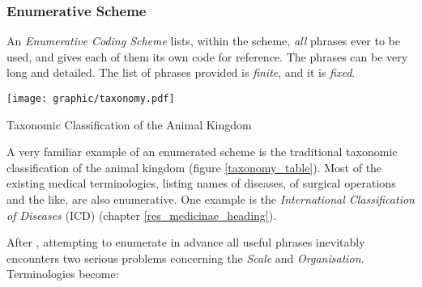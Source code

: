 %
%
%
%
%
%
%

\subsubsection{Enumerative Scheme}
\label{enumerative_scheme_heading}

An \emph{Enumerative Coding Scheme} lists, within the scheme, \emph{all} phrases
ever to be used, and gives each of them its own code for reference. The phrases
can be very long and detailed. The list of phrases provided is \emph{finite},
and it is \emph{fixed}.

\begin{table}[ht]
    \begin{center}
        \texttt{[image: graphic/taxonomy.pdf]}
        \caption{Taxonomic Classification of the Animal Kingdom}
        \label{taxonomy_table}
    \end{center}
\end{table}

A very familiar example of an enumerated scheme is the traditional taxonomic
classification of the animal kingdom (figure \ref{taxonomy_table}). Most of the
existing medical terminologies, listing names of diseases, of surgical
operations and the like, are also enumerative. One example is the
\emph{International Classification of Diseases} (ICD) (chapter
\ref{res_medicinae_heading}).

After \cite{rogers}, attempting to enumerate in advance all useful phrases
inevitably encounters two serious problems concerning the \emph{Scale} and
\emph{Organisation}. Terminologies become:


